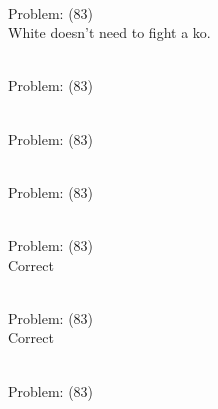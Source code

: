 \documentclass[11pt]{article}
\begin{document}
\begin{minipage}[t]{0.5\textwidth}
  {\centering
  
\\
Problem: (83)\\
White doesn't need to fight a ko.\\
  }
\end{minipage}
\begin{minipage}[t]{0.5\textwidth}
  {\centering
  
\\
Problem: (83)\\
  }
\end{minipage}
\begin{minipage}[t]{0.5\textwidth}
  {\centering
  
\\
Problem: (83)\\
  }
\end{minipage}
\begin{minipage}[t]{0.5\textwidth}
  {\centering
  
\\
Problem: (83)\\
  }
\end{minipage}
\begin{minipage}[t]{0.5\textwidth}
  {\centering
  
\\
Problem: (83)\\
Correct\\
  }
\end{minipage}
\begin{minipage}[t]{0.5\textwidth}
  {\centering
  
\\
Problem: (83)\\
Correct\\
  }
\end{minipage}
\begin{minipage}[t]{0.5\textwidth}
  {\centering
  
\\
Problem: (83)\\
  }
\end{minipage}
\end{document}
